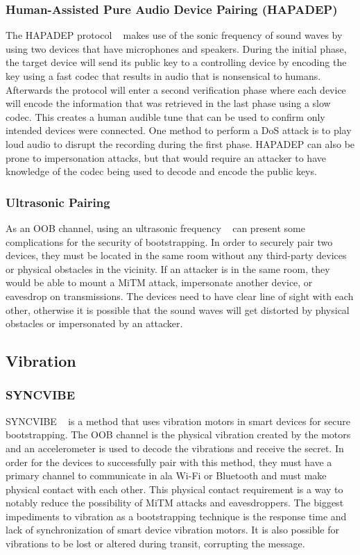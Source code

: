 \subsubsection{Human-Assisted Pure Audio Device Pairing (HAPADEP)}
The HAPADEP protocol ~\cite{soriente2008hapadep} makes use of the sonic frequency of sound waves by using two devices that have microphones and speakers. During the initial phase, the target device will send its public key to a controlling device by encoding the key using a fast codec that results in audio that is nonsensical to humans. Afterwards the protocol will enter a second verification phase where each device will encode the information that was retrieved in the last phase using a slow codec. This creates a human audible tune that can be used to confirm only intended devices were connected. One method to perform a DoS attack is to play loud audio to disrupt the recording during the first phase. HAPADEP can also be prone to impersonation attacks, but that would require an attacker to have knowledge of the codec being used to decode and encode the public keys. 

\subsubsection{Ultrasonic Pairing}
As an OOB channel, using an ultrasonic frequency ~\cite{mayrhofer2007security} can present some complications for the security of bootstrapping. In order to securely pair two devices, they must be located in the same room without any third-party devices or physical obstacles in the vicinity. If an attacker is in the same room, they would be able to mount a MiTM attack, impersonate another device, or eavesdrop on transmissions. The devices need to have clear line of sight with each other, otherwise it is possible that the sound waves will get distorted by physical obstacles or impersonated by an attacker.

\subsection{Vibration}
\subsubsection{SYNCVIBE}
SYNCVIBE ~\cite{lee2018syncvibe} is a method that uses vibration motors in smart devices for secure bootstrapping. The OOB channel is the physical vibration created by the motors and an accelerometer is used to decode the vibrations and receive the secret. In order for the devices to successfully pair with this method, they must have a primary channel to communicate in ala Wi-Fi or Bluetooth and must make physical contact with each other. This physical contact requirement is a way to notably reduce the possibility of MiTM attacks and eavesdroppers. The biggest impediments to vibration as a bootstrapping technique is the response time and lack of synchronization of smart device vibration motors. It is also possible for vibrations to be lost or altered during transit, corrupting the message.


